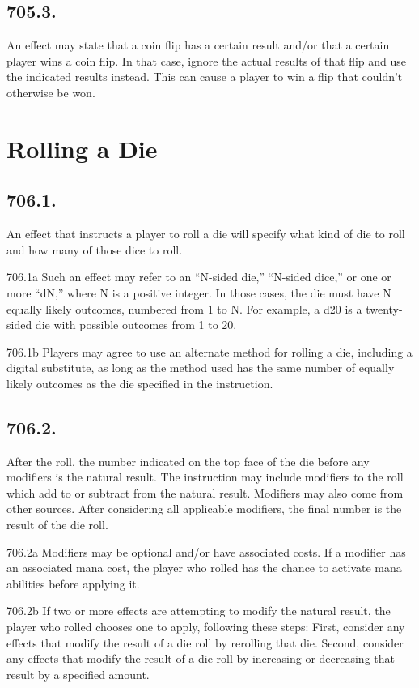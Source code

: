 \subsection*{705.3.}
An effect may state that a coin flip has a certain result and/or that a certain player wins a coin flip. In that case, ignore the actual results of that flip and use the indicated results instead. This can cause a player to win a flip that couldn’t otherwise be won.

\section{Rolling a Die}
\subsection*{706.1.}
An effect that instructs a player to roll a die will specify what kind of die to roll and how many of those dice to roll.

706.1a Such an effect may refer to an “N-sided die,” “N-sided dice,” or one or more “dN,” where N is a positive integer. In those cases, the die must have N equally likely outcomes, numbered from 1 to N. For example, a d20 is a twenty-sided die with possible outcomes from 1 to 20.

706.1b Players may agree to use an alternate method for rolling a die, including a digital substitute, as long as the method used has the same number of equally likely outcomes as the die specified in the instruction.

\subsection*{706.2.}
After the roll, the number indicated on the top face of the die before any modifiers is the natural result. The instruction may include modifiers to the roll which add to or subtract from the natural result. Modifiers may also come from other sources. After considering all applicable modifiers, the final number is the result of the die roll.

706.2a Modifiers may be optional and/or have associated costs. If a modifier has an associated mana cost, the player who rolled has the chance to activate mana abilities before applying it.

706.2b If two or more effects are attempting to modify the natural result, the player who rolled chooses one to apply, following these steps: First, consider any effects that modify the result of a die roll by rerolling that die. Second, consider any effects that modify the result of a die roll by increasing or decreasing that result by a specified amount.

